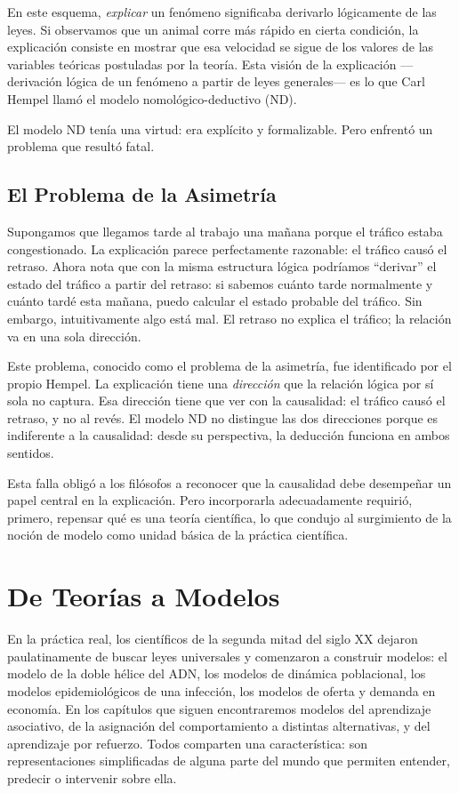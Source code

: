 \documentclass[
  letterpaper,
  DIV=11,
  numbers=noendperiod]{scrreprt}
\begin{document}
En este esquema, \emph{explicar} un fenómeno significaba derivarlo
lógicamente de las leyes. Si observamos que un animal corre más rápido
en cierta condición, la explicación consiste en mostrar que esa
velocidad se sigue de los valores de las variables teóricas postuladas
por la teoría. Esta visión de la explicación ---derivación lógica de un
fenómeno a partir de leyes generales--- es lo que Carl Hempel llamó el
modelo nomológico-deductivo (ND).

El modelo ND tenía una virtud: era explícito y formalizable. Pero
enfrentó un problema que resultó fatal.

\subsection{El Problema de la
Asimetría}\label{el-problema-de-la-asimetruxeda}

Supongamos que llegamos tarde al trabajo una mañana porque el tráfico
estaba congestionado. La explicación parece perfectamente razonable: el
tráfico causó el retraso. Ahora nota que con la misma estructura lógica
podríamos ``derivar'' el estado del tráfico a partir del retraso: si
sabemos cuánto tarde normalmente y cuánto tardé esta mañana, puedo
calcular el estado probable del tráfico. Sin embargo, intuitivamente
algo está mal. El retraso no explica el tráfico; la relación va en una
sola dirección.

Este problema, conocido como el problema de la asimetría, fue
identificado por el propio Hempel. La explicación tiene una
\emph{dirección} que la relación lógica por sí sola no captura. Esa
dirección tiene que ver con la causalidad: el tráfico causó el retraso,
y no al revés. El modelo ND no distingue las dos direcciones porque es
indiferente a la causalidad: desde su perspectiva, la deducción funciona
en ambos sentidos.

Esta falla obligó a los filósofos a reconocer que la causalidad debe
desempeñar un papel central en la explicación. Pero incorporarla
adecuadamente requirió, primero, repensar qué es una teoría científica,
lo que condujo al surgimiento de la noción de modelo como unidad básica
de la práctica científica.

\section{De Teorías a Modelos}\label{de-teoruxedas-a-modelos}

En la práctica real, los científicos de la segunda mitad del siglo XX
dejaron paulatinamente de buscar leyes universales y comenzaron a
construir modelos: el modelo de la doble hélice del ADN, los modelos de
dinámica poblacional, los modelos epidemiológicos de una infección, los
modelos de oferta y demanda en economía. En los capítulos que siguen
encontraremos modelos del aprendizaje asociativo, de la asignación del
comportamiento a distintas alternativas, y del aprendizaje por refuerzo.
Todos comparten una característica: son representaciones simplificadas
de alguna parte del mundo que permiten entender, predecir o intervenir
sobre ella.
\end{document}
